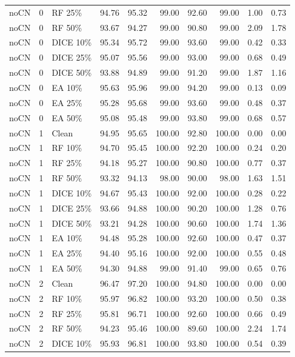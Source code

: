 {\begin{longtable}{rllrrrrrrr}
noCN & 0 & RF 25\% & 94.76 & 95.32 & 99.00 & 92.60 & 99.00 & 1.00 & 0.73 \\
noCN & 0 & RF 50\% & 93.67 & 94.27 & 99.00 & 90.80 & 99.00 & 2.09 & 1.78 \\
noCN & 0 & DICE 10\% & 95.34 & 95.72 & 99.00 & 93.60 & 99.00 & 0.42 & 0.33 \\
noCN & 0 & DICE 25\% & 95.07 & 95.56 & 99.00 & 93.00 & 99.00 & 0.68 & 0.49 \\
noCN & 0 & DICE 50\% & 93.88 & 94.89 & 99.00 & 91.20 & 99.00 & 1.87 & 1.16 \\
noCN & 0 & EA 10\% & 95.63 & 95.96 & 99.00 & 94.20 & 99.00 & 0.13 & 0.09 \\
noCN & 0 & EA 25\% & 95.28 & 95.68 & 99.00 & 93.60 & 99.00 & 0.48 & 0.37 \\
noCN & 0 & EA 50\% & 95.08 & 95.48 & 99.00 & 93.80 & 99.00 & 0.68 & 0.57 \\
noCN & 1 & Clean & 94.95 & 95.65 & 100.00 & 92.80 & 100.00 & 0.00 & 0.00 \\
noCN & 1 & RF 10\% & 94.70 & 95.45 & 100.00 & 92.20 & 100.00 & 0.24 & 0.20 \\
noCN & 1 & RF 25\% & 94.18 & 95.27 & 100.00 & 90.80 & 100.00 & 0.77 & 0.37 \\
noCN & 1 & RF 50\% & 93.32 & 94.13 & 98.00 & 90.00 & 98.00 & 1.63 & 1.51 \\
noCN & 1 & DICE 10\% & 94.67 & 95.43 & 100.00 & 92.00 & 100.00 & 0.28 & 0.22 \\
noCN & 1 & DICE 25\% & 93.66 & 94.88 & 100.00 & 90.20 & 100.00 & 1.28 & 0.76 \\
noCN & 1 & DICE 50\% & 93.21 & 94.28 & 100.00 & 90.60 & 100.00 & 1.74 & 1.36 \\
noCN & 1 & EA 10\% & 94.48 & 95.28 & 100.00 & 92.60 & 100.00 & 0.47 & 0.37 \\
noCN & 1 & EA 25\% & 94.40 & 95.16 & 100.00 & 92.00 & 100.00 & 0.55 & 0.48 \\
noCN & 1 & EA 50\% & 94.30 & 94.88 & 99.00 & 91.40 & 99.00 & 0.65 & 0.76 \\
noCN & 2 & Clean & 96.47 & 97.20 & 100.00 & 94.80 & 100.00 & 0.00 & 0.00 \\
noCN & 2 & RF 10\% & 95.97 & 96.82 & 100.00 & 93.20 & 100.00 & 0.50 & 0.38 \\
noCN & 2 & RF 25\% & 95.81 & 96.71 & 100.00 & 92.60 & 100.00 & 0.66 & 0.49 \\
noCN & 2 & RF 50\% & 94.23 & 95.46 & 100.00 & 89.60 & 100.00 & 2.24 & 1.74 \\
noCN & 2 & DICE 10\% & 95.93 & 96.81 & 100.00 & 93.80 & 100.00 & 0.54 & 0.39 \\

\end{longtable}}
